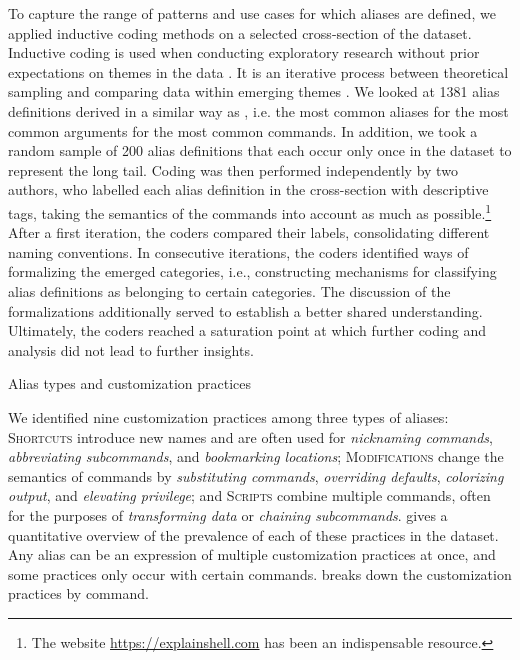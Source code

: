 To capture the range of patterns and use cases for which aliases are defined, we applied inductive coding methods on a selected cross-section of the dataset.
Inductive coding is used when conducting exploratory research without prior expectations on themes in the data \cite{thomas:06}.
It is an iterative process between theoretical sampling and comparing data within emerging themes \cite{dey:03}.
We looked at 1381 alias definitions derived in a similar way as , i.e. the most common aliases for the most common arguments for the most common commands.
In addition, we took a random sample of 200 alias definitions that each occur only once in the dataset to represent the long tail.
Coding was then performed independently by two authors, who labelled each alias definition in the cross-section with descriptive tags, taking the semantics of the commands into account as much as possible.\footnote{The website \url{https://explainshell.com} has been an indispensable resource.}
After a first iteration, the coders compared their labels, consolidating different naming conventions.
In consecutive iterations, the coders identified ways of formalizing the emerged categories, i.e., constructing mechanisms for classifying alias definitions as belonging to certain categories.
The discussion of the formalizations additionally served to establish a better shared understanding.
Ultimately, the coders reached a saturation point at which further coding and analysis did not lead to further insights.

\begin{table}
	\caption{Alias types and customization practices}
    \label{tab:practices}
\end{table}


We identified nine customization practices among three types of aliases:
\textsc{Shortcuts} introduce new names and are often used for \emph{nicknaming commands}, \emph{abbreviating subcommands}, and \emph{bookmarking locations};
\textsc{Modifications} change the semantics of commands by \emph{substituting commands}, \emph{overriding defaults}, \emph{colorizing output}, and \emph{elevating privilege};
and \textsc{Scripts} combine multiple commands, often for the purposes of \emph{transforming data} or \emph{chaining subcommands}.
 gives a quantitative overview of the prevalence of each of these practices in the dataset.
Any alias can be an expression of multiple customization practices at once, and some practices only occur with certain commands.
 breaks down the customization practices by command.

